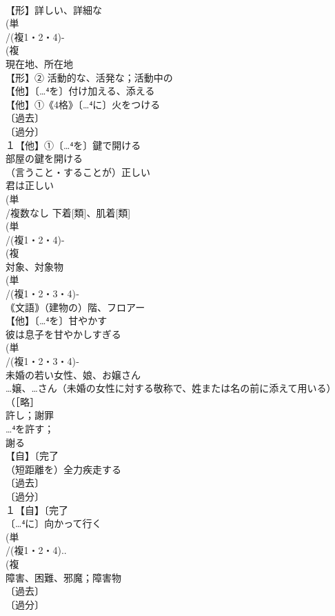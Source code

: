 \documentclass[8pt]{extreport}
\begin{document}
\begin{CJK}{UTF8}{min}
\\	【形】詳しい、詳細な 
\\	(単
\\	/(複1・2・4)-
\\	(複
\\	現在地、所在地
\\	【形】② 活動的な、活発な；活動中の
\\	【他】〔…⁴を〕付け加える、添える 
\\	【他】①《4格》〔…⁴に〕火をつける 
\\	〔過去〕
\\	〔過分〕
\\	１【他】①〔…⁴を〕鍵で開ける 
\\	部屋の鍵を開ける
\\	（言うこと・することが）正しい　
\\	君は正しい
\\	(単
\\	/複数なし 下着[類]、肌着[類] 
\\	(単
\\	/(複1・2・4)-
\\	(複
\\	対象、対象物
\\	(単
\\	/(複1・2・3・4)‐
\\	｟文語｠（建物の）階、フロアー 
\\	【他】〔…⁴を〕甘やかす 
\\	彼は息子を甘やかしすぎる
\\	(単
\\	/(複1・2・3・4)‐ 
\\	未婚の若い女性、娘、お嬢さん 
\\	…嬢、…さん（未婚の女性に対する敬称で、姓または名の前に添えて用いる）（［略］
\\	許し；謝罪 
\\	…⁴を許す；
\\	謝る
\\	【自】〔完了
\\	（短距離を）全力疾走する 
\\	〔過去〕
\\	〔過分〕
\\	１【自】〔完了
\\	〔…⁴に〕向かって行く
\\	(単
\\	/(複1・2・4)..
\\	(複
\\	障害、困難、邪魔；障害物 
\\	〔過去〕
\\	〔過分〕

\end{CJK}
\end{document}
